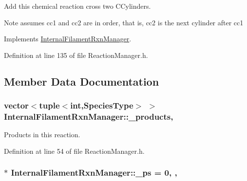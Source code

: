 Add this chemical reaction cross two C\+Cylinders. 

\begin{DoxyNote}{Note}
assumes cc1 and cc2 are in order, that is, cc2 is the next cylinder after cc1 
\end{DoxyNote}


Implements \hyperlink{classInternalFilamentRxnManager_ac8152bcd9f6aa5d69f85a98cff86d2b0}{Internal\+Filament\+Rxn\+Manager}.



Definition at line 135 of file Reaction\+Manager.\+h.



\subsection{Member Data Documentation}
\hypertarget{classInternalFilamentRxnManager_afd213da1a3706e2e88962e5da886a5dc}{
\subsubsection[{\+\_\+products}]{\setlength{\rightskip}{0pt plus 5cm}vector$<$tuple$<$int,{\bf Species\+Type}$>$ $>$ Internal\+Filament\+Rxn\+Manager\+::\+\_\+products\hspace{0.3cm}{\ttfamily [protected]}, {\ttfamily [inherited]}}}\label{classInternalFilamentRxnManager_afd213da1a3706e2e88962e5da886a5dc}


Products in this reaction. 



Definition at line 54 of file Reaction\+Manager.\+h.

\hypertarget{classInternalFilamentRxnManager_a973ce9cc2aae811e6867afa46193c5f2}{
\subsubsection[{\+\_\+ps}]{ $\ast$ Internal\+Filament\+Rxn\+Manager\+::\+\_\+ps = 0\hspace{0.3cm}{\ttfamily [static]}, {\ttfamily [protected]}, {\ttfamily [inherited]}}}\label{classInternalFilamentRxnManager_a973ce9cc2aae811e6867afa46193c5f2}


